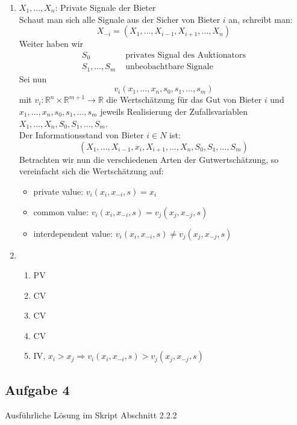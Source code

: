 \documentclass[12pt]{extreport} %
\newcommand{\R}{\mathbb{R}}
\theoremstyle{named}
\theoremstyle{itshape}
\theoremstyle{normal}
\begin{document}
\begin{enumerate}
	\item $X_1, \dotsc, X_n$: Private Signale der Bieter ~\\
		Schaut man sich alle Signale aus der Sicher von Bieter $i$ an, schreibt man:
		$$ X_{-i} = \left( X_1, \dotsc, X_{i-1}, X_{i+1}, \dotsc, X_{n} \right) $$
		Weiter haben wir
		\begin{align*}
			S_{0} & \text{ privates Signal des Auktionators} \\
			S_{1}, \dotsc, S_{m} & \text{ unbeobachtbare Signale}
		\end{align*}	
		Sei nun 
		$$ v_{i}(x_1, \dotsc, x_{n}, s_{0}, s_{1}, \dotsc, s_{m}) $$
		mit $v_i \colon \R^{n} \times \R^{m+1} \rightarrow \R$ die Wertschätzung für das Gut von Bieter $i$ und $x_1, \dotsc, x_{n}, s_{0}, s_{1}, \dotsc, s_{m}$ jeweils Realisierung der Zufallsvariablen $X_1, \dotsc, X_n, S_0, S_1, \dotsc, S_m$. ~\\
		
		Der Informationsstand von Bieter $i \in N$ ist:
			$$ \left( X_1, \dotsc, X_{i-1}, x_i, X_{i+1}, \dotsc, X_n, S_0, S_1, \dotsc, S_m \right) $$
		Betrachten wir nun die verschiedenen Arten der Gutwertschätzung, so vereinfacht sich die Wertschätzung auf:
		\begin{itemize}
			\item private value: $v_i(x_i, x_{-i}, s) = x_i$
			\item common value: $v_i(x_i, x_{-i}, s) = v_{j}(x_{j}, x_{-j}, s)$
			\item interdependent value: $v_i(x_i, x_{-i}, s) \neq v_{j}(x_{j}, x_{-j}, s)$
		\end{itemize}
	\item \begin{enumerate}[label=\arabic*\upshape)]
		\item PV
		\item CV
		\item CV
		\item CV
		\item IV, $x_i > x_j \Rightarrow v_i(x_i, x_{-i}, s) > v_j(x_j, x_{-j}, s)$
	\end{enumerate}
\end{enumerate}

\subsection*{Aufgabe 4}

Ausführliche Lösung im Skript Abschnitt 2.2.2
\end{document}
